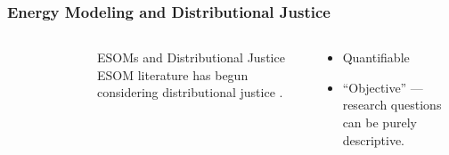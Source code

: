 \begin{frame}
    \frametitle{Energy Modeling and Distributional Justice}
    \begin{columns}
        \column[t]{3cm}
        \begin{figure}
            \centering
        \end{figure}
        \column[t]{7cm}
        \begin{block}{ESOMs and Distributional Justice}
            ESOM literature has begun considering distributional justice
            \cite{neumann_near-optimal_2021,sasse_distributional_2019,obrecht_integrating_2020}.
        \end{block}
        \begin{block}{}
            \begin{itemize}
                \item Quantifiable
                \item ``Objective'' --- research questions can be purely
                descriptive.
            \end{itemize}
        \end{block}
    \end{columns}
    
\end{frame}


